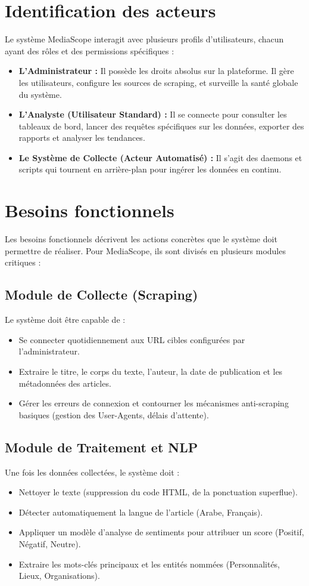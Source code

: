 \documentclass[12pt,a4paper,oneside]{report}
\begin{document}
\section{Identification des acteurs}
Le système MediaScope interagit avec plusieurs profils d'utilisateurs, chacun ayant des rôles et des permissions spécifiques :
\begin{itemize}[label=\textcolor{secondary}{\textbullet}, itemsep=8pt]
    \item \textbf{L'Administrateur :} Il possède les droits absolus sur la plateforme. Il gère les utilisateurs, configure les sources de scraping, et surveille la santé globale du système.
    \item \textbf{L'Analyste (Utilisateur Standard) :} Il se connecte pour consulter les tableaux de bord, lancer des requêtes spécifiques sur les données, exporter des rapports et analyser les tendances.
    \item \textbf{Le Système de Collecte (Acteur Automatisé) :} Il s'agit des daemons et scripts qui tournent en arrière-plan pour ingérer les données en continu.
\end{itemize}

\section{Besoins fonctionnels}
Les besoins fonctionnels décrivent les actions concrètes que le système doit permettre de réaliser. Pour MediaScope, ils sont divisés en plusieurs modules critiques :

\subsection{Module de Collecte (Scraping)}
Le système doit être capable de :
\begin{itemize}
    \item Se connecter quotidiennement aux URL cibles configurées par l'administrateur.
    \item Extraire le titre, le corps du texte, l'auteur, la date de publication et les métadonnées des articles.
    \item Gérer les erreurs de connexion et contourner les mécanismes anti-scraping basiques (gestion des User-Agents, délais d'attente).
\end{itemize}

\subsection{Module de Traitement et NLP}
Une fois les données collectées, le système doit :
\begin{itemize}
    \item Nettoyer le texte (suppression du code HTML, de la ponctuation superflue).
    \item Détecter automatiquement la langue de l'article (Arabe, Français).
    \item Appliquer un modèle d'analyse de sentiments pour attribuer un score (Positif, Négatif, Neutre).
    \item Extraire les mots-clés principaux et les entités nommées (Personnalités, Lieux, Organisations).
\end{itemize}
\end{document}

